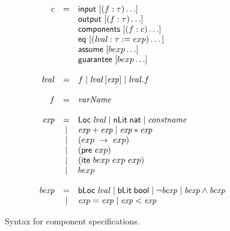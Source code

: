 \begin{figure}
  \[
    \begin{array}{rcl}
      \mathit{c}    & = & \mathsf{input}\ [(f : \tau)\ldots] \\
                    &   & \mathsf{output}\ [(f : \tau)\ldots] \\
                    &   & \mathsf{components}\ [(f : c)\ldots]\\ 
                    &   & \mathsf{eq}\ [(\mathit{lval} : \tau := exp) \dots] \\
                    &   & \mathsf{assume}\ [bexp\ldots] \\
                    &   & \mathsf{guarantee}\ [bexp\ldots] \\ \\

      \mathit{lval} & = & f \mid \mathit{lval} \, [ \mathit{exp} ]
                          \mid \mathit{lval} . f \\ \\

      f             & = & \mathit{varName} \\ \\

      \mathit{exp}  & = & \mathsf{Loc}\; \mathit{lval}
                          \mid \mathsf{nLit}\; \mathsf{nat}
                          \mid \mathit{constname} \\
                    & | & \mathit{exp} + \mathit{exp}
                          \mid \mathit{exp} * \mathit{exp} \\
                    & | & (exp\ \rightarrow\ exp) \\
                    & | & (\mathsf{pre}\ exp) \\
                    & | & (\mathsf{ite}\ bexp\ exp\ exp)\\
                    & | & bexp \\ \\
                          
      \mathit{bexp} & = & \mathsf{bLoc}\; \mathit{lval}
                          \mid  \mathsf{bLit}\; \mathsf{bool}
                          \mid  \neg \mathit{bexp}
                          \mid  \mathit{bexp} \land \mathit{bexp} \\
                    & | & \mathit{exp} = \mathit{exp} 
                    \mid  \mathit{exp} < \mathit{exp}
\end{array}
\]
\caption{Syntax for component specifications.}
\label{fig:syntax}
\end{figure}

